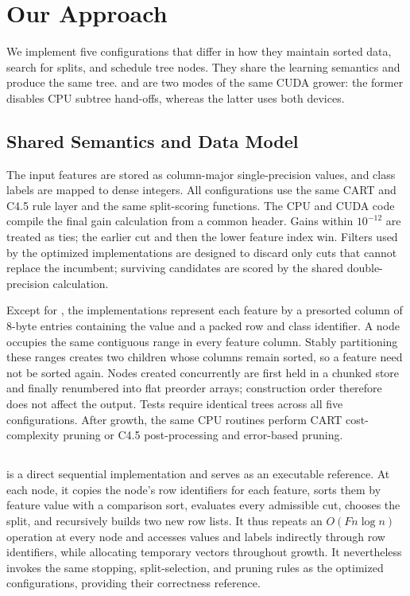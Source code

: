 \section{Our Approach}
\label{sec:impl}

We implement five configurations that differ in how they maintain sorted data, search for splits, and schedule tree nodes.  They share the learning semantics and produce the same tree.  \ImplGpu{} and \ImplHybrid{} are two modes of the same CUDA grower: the former disables CPU subtree hand-offs, whereas the latter uses both devices.

\subsection{Shared Semantics and Data Model}

The input features are stored as column-major single-precision values, and class labels are mapped to dense integers.  All configurations use the same CART and C4.5 rule layer and the same split-scoring functions.  The CPU and CUDA code compile the final gain calculation from a common header.  Gains within \(10^{-12}\) are treated as ties; the earlier cut and then the lower feature index win.  Filters used by the optimized implementations are designed to discard only cuts that cannot replace the incumbent; surviving candidates are scored by the shared double-precision calculation.

Except for \ImplSerialBase{}, the implementations represent each feature by a presorted column of 8-byte entries containing the value and a packed row and class identifier.  A node occupies the same contiguous range in every feature column.  Stably partitioning these ranges creates two children whose columns remain sorted, so a feature need not be sorted again.  Nodes created concurrently are first held in a chunked store and finally renumbered into flat preorder arrays; construction order therefore does not affect the output. Tests require identical trees across all five configurations.  After growth, the same CPU routines perform CART cost-complexity pruning or C4.5 post-processing and error-based pruning.

\subsection{\ImplSerialBase}

\ImplSerialBase{} is a direct sequential implementation and serves as an executable reference.  At each node, it copies the node's row identifiers for each feature, sorts them by feature value with a comparison sort, evaluates every admissible cut, chooses the split, and recursively builds two new row lists.  It thus repeats an \(O(Fn\log n)\) operation at every node and accesses values and labels indirectly through row identifiers, while allocating temporary vectors throughout growth.  It nevertheless invokes the same stopping, split-selection, and pruning rules as the optimized configurations, providing their correctness reference.

